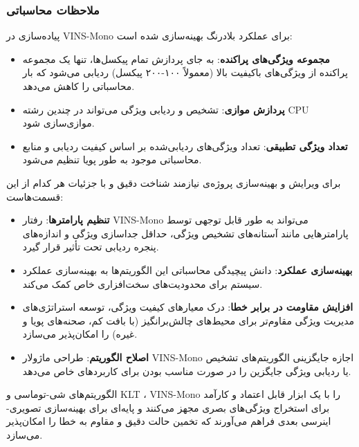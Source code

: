 \documentclass[11pt, a4paper]{article}
\begin{document}
	\subsubsection{ملاحظات محاسباتی}
	پیاده‌سازی در VINS-Mono برای عملکرد بلادرنگ بهینه‌سازی شده است:
	
	\begin{itemize}
		\item \textbf{مجموعه ویژگی‌های پراکنده}: به جای پردازش تمام پیکسل‌ها، تنها یک مجموعه پراکنده از ویژگی‌های باکیفیت بالا (معمولاً ۱۰۰-۲۰۰ پیکسل) ردیابی می‌شود که بار محاسباتی را کاهش می‌دهد.
		
		\item \textbf{پردازش موازی}: تشخیص و ردیابی ویژگی می‌تواند در چندین رشته CPU موازی‌سازی شود.	
		\item \textbf{تعداد ویژگی تطبیقی}: تعداد ویژگی‌های ردیابی‌شده بر اساس کیفیت ردیابی و منابع محاسباتی موجود به طور پویا تنظیم می‌شود.
	\end{itemize}
	
	
	برای ویرایش و بهینه‌سازی پروژه‌ی 
	نیازمند شناخت دقیق و با جزئیات هر کدام از این قسمت‌هاست:
	
	\begin{itemize}
		\item \textbf{تنظیم پارامترها}: رفتار VINS-Mono می‌تواند به طور قابل توجهی توسط پارامترهایی مانند آستانه‌های تشخیص ویژگی، حداقل جداسازی ویژگی و اندازه‌های پنجره ردیابی تحت تأثیر قرار گیرد.
		
		\item \textbf{بهینه‌سازی عملکرد}: دانش پیچیدگی محاسباتی این الگوریتم‌ها به بهینه‌سازی عملکرد سیستم برای محدودیت‌های سخت‌افزاری خاص کمک می‌کند.
		
		\item \textbf{افزایش مقاومت در برابر خطا}: درک معیارهای کیفیت ویژگی، توسعه استراتژی‌های مدیریت ویژگی مقاوم‌تر برای محیط‌های چالش‌برانگیز (با بافت کم، صحنه‌های پویا و غیره) را امکان‌پذیر می‌سازد.
		
		\item \textbf{اصلاح الگوریتم}: طراحی ماژولار VINS-Mono اجازه جایگزینی الگوریتم‌های تشخیص یا ردیابی ویژگی جایگزین را در صورت مناسب بودن برای کاربردهای خاص می‌دهد.
	\end{itemize}
	
	الگوریتم‌های شی-توماسی و 
	\gls{KLT}
	، VINS-Mono را با یک ابزار قابل اعتماد و کارآمد برای استخراج ویژگی‌های بصری مجهز می‌کنند و پایه‌ای برای بهینه‌سازی تصویری-اینرسی بعدی فراهم می‌آورند که تخمین حالت دقیق و مقاوم  به خطا را امکان‌پذیر می‌سازد.
	
\end{document}
